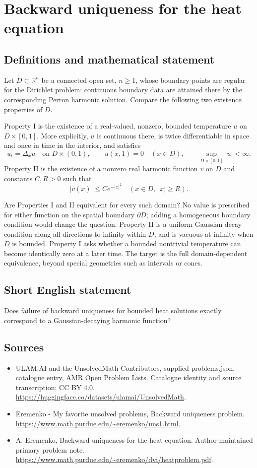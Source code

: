 \documentclass[11pt,a4paper]{article}
\begin{document}
\section*{Backward uniqueness for the heat equation}\label{statement}

\subsection{Definitions and mathematical statement}
Let $D\subset\mathbb R^n$ be a connected open set, $n\geq1$,
whose boundary points are regular for the Dirichlet problem:
continuous boundary data are attained there by the corresponding
Perron harmonic solution. Compare the following two existence
properties of $D$.

Property I is the existence of a real-valued, nonzero, bounded
temperature $u$ on $D\times[0,1]$. More explicitly, $u$ is
continuous there, is twice differentiable in space and once in
time in the interior, and satisfies
\[
 u_t=\Delta_xu\quad\text{on }D\times(0,1),\qquad
 u(x,1)=0\quad(x\in D),\qquad
 \sup_{D\times[0,1]}|u|<\infty.
\]
Property II is the existence of a nonzero real harmonic
function $v$ on $D$ and constants $C,R>0$ such that
\[
             |v(x)|\leq C e^{-|x|^2}
       \quad(x\in D,\ |x|\geq R).
\]

Are Properties I and II equivalent for every such domain?
No value is prescribed for either function on the spatial
boundary $\partial D$; adding a homogeneous boundary
condition would change the question. Property II is a
uniform Gaussian decay condition along all directions to
infinity within $D$, and is vacuous at infinity when $D$
is bounded. Property I asks whether a bounded nontrivial
temperature can become identically zero at a later time.
The target is the full domain-dependent equivalence, beyond
special geometries such as intervals or cones.
\subsection{Short English statement}
Does failure of backward uniqueness for bounded heat solutions exactly correspond to a Gaussian-decaying harmonic function?
\subsection{Sources}
\begin{itemize}
\item[S1] ULAM.AI and the UnsolvedMath Contributors, supplied problems.json, catalogue entry, AMR Open Problem Lists. Catalogue identity and source transcription; CC BY 4.0.
\url{https://huggingface.co/datasets/ulamai/UnsolvedMath}.
\item[S2] Eremenko - My favorite unsolved problems, Backward uniqueness problem. 
\url{https://www.math.purdue.edu/~eremenko/uns1.html}.
\item[S3] A. Eremenko, Backward uniqueness for the heat equation. Author-maintained primary problem note.
\url{https://www.math.purdue.edu/~eremenko/dvi/heatproblem.pdf}.
\end{itemize}
\end{document}
